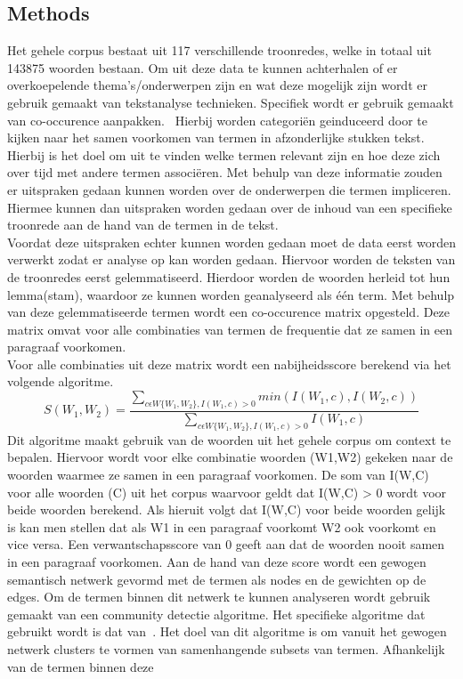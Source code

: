 \subsection{Methods}
Het gehele corpus bestaat uit 117 verschillende troonredes, welke in totaal uit 143875 woorden bestaan. Om uit deze data te kunnen achterhalen of er overkoepelende thema's/onderwerpen zijn en wat deze mogelijk zijn wordt er gebruik gemaakt van tekstanalyse technieken. Specifiek wordt er gebruik gemaakt van co-occurence aanpakken.~\cite{callon1991co} Hierbij worden categoriën geinduceerd door te kijken naar het samen voorkomen van termen in afzonderlijke stukken tekst. Hierbij is het doel om uit te vinden welke termen relevant zijn en hoe deze zich over tijd met andere termen associëren. Met behulp van deze informatie zouden er uitspraken gedaan kunnen worden over de onderwerpen die termen impliceren. Hiermee kunnen dan uitspraken worden gedaan over de inhoud van een specifieke troonrede aan de hand van de termen in de tekst. 
\\
Voordat deze uitspraken echter kunnen worden gedaan moet de data eerst worden verwerkt zodat er analyse op kan worden gedaan. Hiervoor worden de teksten van de troonredes eerst gelemmatiseerd. Hierdoor worden de woorden herleid tot hun lemma(stam), waardoor ze kunnen worden geanalyseerd als één term. Met behulp van deze gelemmatiseerde termen wordt een co-occurence matrix opgesteld. Deze matrix omvat voor alle combinaties van termen de frequentie dat ze samen in een paragraaf voorkomen. 
\\
Voor alle combinaties uit deze matrix wordt een nabijheidsscore berekend via het volgende algoritme. $$S(W_1,W_2)=\frac{\sum_{c\epsilon W\{W_1,W_2\},I(W_1,c)>0}min(I(W_1,c),I(W_2,c))}{\sum_{c\epsilon W\{W_1,W_2\},I(W_1,c)>0}I(W_1,c)}$$ Dit algoritme maakt gebruik van de woorden uit het gehele corpus om context te bepalen. Hiervoor wordt voor elke combinatie woorden (W1,W2) gekeken naar de woorden waarmee ze
samen in een paragraaf voorkomen. De som van I(W,C) voor alle woorden (C) uit het corpus waarvoor geldt dat I(W,C) > 0 wordt voor beide woorden berekend. Als hieruit volgt dat I(W,C) voor beide woorden gelijk is kan men stellen dat als W1 in een paragraaf voorkomt W2 ook voorkomt en vice versa. Een verwantschapsscore van 0 geeft aan dat de woorden nooit samen in een paragraaf voorkomen. Aan de hand van deze score wordt een gewogen semantisch netwerk gevormd met de termen als nodes en de gewichten op de edges. Om de termen binnen dit netwerk te kunnen analyseren wordt gebruik gemaakt van een community detectie algoritme. Het specifieke algoritme dat gebruikt wordt is dat van~\cite{blondel2008fast}. Het doel van dit algoritme is om vanuit het gewogen netwerk clusters te vormen van samenhangende subsets van termen. Afhankelijk van de termen binnen deze
